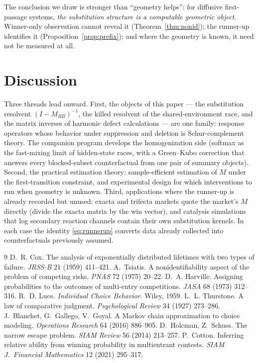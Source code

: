 \documentclass[11pt]{article}
\theoremstyle{remark}
\begin{document}
The conclusion we draw is stronger than ``geometry helps'': for diffusive
first-passage systems, \emph{the substitution structure is a computable geometric
object}. Winner-only observation cannot reveal it (Theorem~\ref{thm:nonid}); the
runner-up identifies it (Proposition~\ref{prop:prefix}); and where the geometry is
known, it need not be measured at all.

\section{Discussion}

Three threads lead onward. First, the objects of this paper --- the substitution
resolvent $(I - M_{BB})^{-1}$, the killed resolvent of the shared-environment race,
and the matrix inverses of harmonic defect calculations --- are one family: response
operators whose behavior under suppression and deletion is Schur-complement theory.
The companion program develops the homogenization side (softmax as the fast-mixing
limit of hidden-state races, with a Green--Kubo correction that answers every
blocked-subset counterfactual from one pair of summary objects). Second, the
practical estimation theory: sample-efficient estimation of $M$ under the
first-transition constraint, and experimental design for which interventions to
run when geometry is unknown. Third, applications where the runner-up is already
recorded but unused: exacta and trifecta markets quote the market's $M$ directly
(divide the exacta matrix by the win vector), and catalysis simulations that log
secondary reaction channels contain their own substitution kernels. In each case
the identity \eqref{eq:runnerup} converts data already collected into
counterfactuals previously assumed.

\begin{thebibliography}{9}
 D.~R. Cox. The analysis of exponentially distributed lifetimes
with two types of failure. \emph{JRSS-B} 21 (1959) 411--421.
 A.~Tsiatis. A nonidentifiability aspect of the problem of
competing risks. \emph{PNAS} 72 (1975) 20--22.
 D.~A. Harville. Assigning probabilities to the outcomes of
multi-entry competitions. \emph{JASA} 68 (1973) 312--316.
 R.~D. Luce. \emph{Individual Choice Behavior}. Wiley, 1959.
 L.~L. Thurstone. A law of comparative judgment.
\emph{Psychological Review} 34 (1927) 273--286.
 J.~Blanchet, G.~Gallego, V.~Goyal. A Markov chain
approximation to choice modeling. \emph{Operations Research} 64 (2016) 886--905.
 D.~Holcman, Z.~Schuss. The narrow escape problem.
\emph{SIAM Review} 56 (2014) 213--257.
 P.~Cotton. Inferring relative ability from winning probability
in multientrant contests. \emph{SIAM J.\ Financial Mathematics} 12 (2021) 295--317.
\end{thebibliography}
\end{document}
